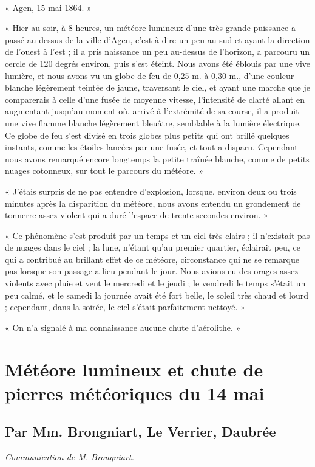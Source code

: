 \documentclass[a4paper, 11pt, oneside, polutonikogreek, french]{article}
\begin{document}
\paragraph{}
« Agen, 15 mai 1864. »

« Hier au soir, à 8 heures, un météore lumineux d'une très grande puissance a passé au-dessus de la ville d'Agen, c'est-à-dire un peu au sud et ayant la direction de l'ouest à l'est ; il a pris naissance un peu au-dessus de l'horizon, a parcouru un cercle de 120 degrés environ, puis s'est éteint. Nous avons été éblouis par une vive lumière, et nous avons vu un globe de feu de 0,25 m. à 0,30 m., d'une couleur blanche légèrement teintée de jaune, traversant le ciel, et ayant une marche que je comparerais à celle d'une fusée de moyenne vitesse, l'intensité de clarté allant en augmentant jusqu'au moment où, arrivé à l'extrémité de sa course, il a produit une vive flamme blanche légèrement bleuâtre, semblable à la lumière électrique. Ce globe de feu s'est divisé en trois globes plus petits qui ont brillé quelques instants, comme les étoiles lancées par une fusée, et tout a disparu. Cependant nous avons remarqué encore longtemps la petite traînée blanche, comme de petits nuages cotonneux, sur tout le parcours du météore. »

« J'étais surpris de ne pas entendre d'explosion, lorsque, environ deux ou trois minutes après la disparition du météore, nous avons entendu un grondement de tonnerre assez violent qui a duré l'espace de trente secondes environ. »

« Ce phénomène s'est produit par un temps et un ciel très clairs ; il n'existait pas de nuages dans le ciel ; la lune, n'étant qu'au premier quartier, éclairait peu, ce qui a contribué au brillant effet de ce météore, circonstance qui ne se remarque pas lorsque son passage a lieu pendant le jour. Nous avions eu des orages assez violents avec pluie et vent le mercredi et le jeudi ; le vendredi le temps s'était un peu calmé, et le samedi la journée avait été fort belle, le soleil très chaud et lourd ; cependant, dans la soirée, le ciel s'était parfaitement nettoyé. »

« On n'a signalé à ma connaissance aucune chute d'aérolithe. »
\clearpage
\section{Météore lumineux et chute de pierres météoriques du 14 mai}
\subsection*{Par Mm. Brongniart, Le Verrier, Daubrée}
\begin{center}
\emph{Communication de M. Brongniart.}
\end{center}
\end{document}
